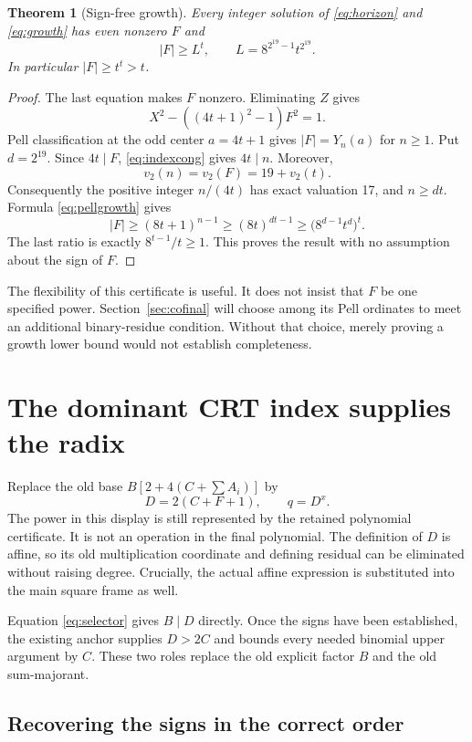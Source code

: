 \documentclass[11pt,a4paper]{article}
\newtheorem{theorem}{Theorem}[section]
\theoremstyle{remark}\newtheorem{remark}[theorem]{Remark}
\newcommand{\vp}{v_2}
\begin{document}
\begin{theorem}[Sign-free growth]\label{thm:growth}
Every integer solution of \eqref{eq:horizon} and \eqref{eq:growth} has even
nonzero $F$ and
\[
|F|\ge L^t,\qquad L=8^{2^{19}-1}t^{2^{19}}.
\]
In particular $|F|\ge t^t>t$.
\end{theorem}
\begin{proof}
The last equation makes $F$ nonzero. Eliminating $Z$ gives
\[
X^2-((4t+1)^2-1)F^2=1.
\]
Pell classification at the odd center $a=4t+1$ gives
$|F|=Y_n(a)$ for $n\ge1$. Put $d=2^{19}$. Since $4t\mid F$,
\eqref{eq:indexcong} gives $4t\mid n$. Moreover,
\[
\vp(n)=\vp(F)=19+\vp(t).
\]
Consequently the positive integer $n/(4t)$ has exact valuation 17, and
$n\ge dt$. Formula \eqref{eq:pellgrowth} gives
\[
|F|\ge(8t+1)^{n-1}\ge(8t)^{dt-1}\ge
\bigl(8^{d-1}t^d\bigr)^t.
\]
The last ratio is exactly $8^{t-1}/t\ge1$. This proves the result with no
assumption about the sign of $F$.
\end{proof}

The flexibility of this certificate is useful. It does not insist that $F$
be one specified power. Section~\ref{sec:cofinal} will choose among its Pell
ordinates to meet an additional binary-residue condition. Without that
choice, merely proving a growth lower bound would not establish completeness.

\section{The dominant CRT index supplies the radix}\label{sec:radix}

Replace the old base $B[2+4(C+\sum A_i)]$ by
\begin{equation}\label{eq:newradix}
D=2(C+F+1),\qquad q=D^x.
\end{equation}
The power in this display is still represented by the retained polynomial
certificate. It is not an operation in the final polynomial. The definition
of $D$ is affine, so its old multiplication coordinate and defining residual
can be eliminated without raising degree. Crucially, the actual affine
expression is substituted into the main square frame as well.

Equation \eqref{eq:selector} gives $B\mid D$ directly. Once the signs have
been established, the existing anchor supplies $D>2C$ and bounds every
needed binomial upper argument by $C$. These two roles replace the old
explicit factor $B$ and the old sum-majorant.

\subsection{Recovering the signs in the correct order}\label{sec:signs}
\end{document}
